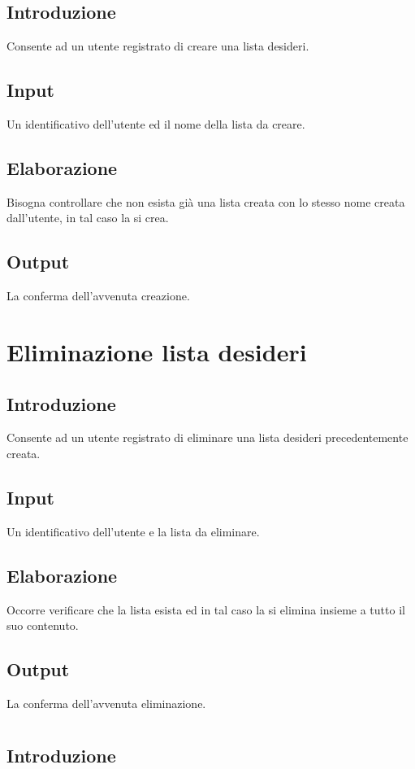 \documentclass{scrreprt}
\begin{document}
\subsection*{Introduzione}
Consente ad un utente registrato di creare una lista desideri.
\subsection*{Input}
Un identificativo dell'utente ed il nome della lista da creare.
\subsection*{Elaborazione}
Bisogna controllare che non esista già una lista creata con lo stesso nome creata dall'utente, in tal
caso la si crea.
\subsection*{Output}
La conferma dell'avvenuta creazione.

\section{Eliminazione lista desideri}

\subsection*{Introduzione}
Consente ad un utente registrato di eliminare una lista desideri precedentemente creata.
\subsection*{Input}
Un identificativo dell’utente e la lista da eliminare.
\subsection*{Elaborazione}
Occorre verificare che la lista esista ed in tal caso la si elimina insieme a tutto il suo contenuto.
\subsection*{Output}
La conferma dell'avvenuta eliminazione.

\section{}

\subsection*{Introduzione}
\end{document}
